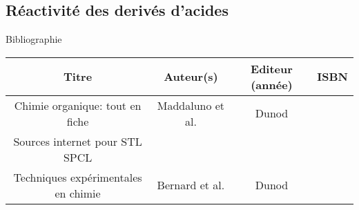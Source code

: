 \begin{headerBlock}
\chapter{Réactivité des derivés d'acides}
\label{LC_Conductimétrie}
 \end{headerBlock}


\begin{reportBlock}{Bibliographie}

\begin{center}
\begin{tabular}{|c|c|c|c|}\hline
Titre & Auteur(s) & Editeur (année) & ISBN \\ \hline
Chimie organique: tout en fiche &  Maddaluno et al. &  Dunod &  \\ \hline
Sources internet pour STL SPCL & ~ &  ~ & ~ \\ \hline
Techniques expérimentales en chimie & Bernard et al. &  Dunod &  \\ \hline
\end{tabular}
\end{center}

\end{reportBlock}

